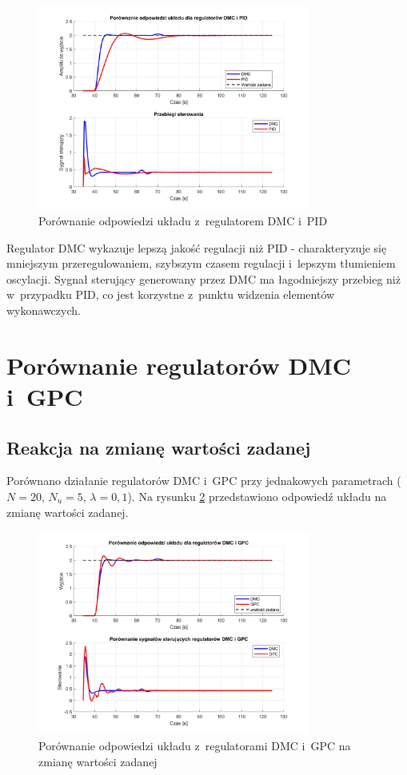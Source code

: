 \documentclass[a4paper,titlepage,11pt,floatssmall]{mwrep}
\begin{document}
\begin{figure}[H]
    \centering
    \includegraphics[width=0.8\textwidth]{kod/wykresy/optimal_solution.jpg}
    \caption{Porównanie odpowiedzi układu z~regulatorem DMC i~PID}
    \label{fig:dmc_pid}
\end{figure}

Regulator DMC wykazuje lepszą jakość regulacji niż PID - charakteryzuje się mniejszym przeregulowaniem, szybszym czasem regulacji i~lepszym tłumieniem oscylacji. Sygnał sterujący generowany przez DMC ma łagodniejszy przebieg niż w~przypadku PID, co jest korzystne z~punktu widzenia elementów wykonawczych.

\section{Porównanie regulatorów DMC i~GPC}

\subsection{Reakcja na zmianę wartości zadanej}

Porównano działanie regulatorów DMC i~GPC przy jednakowych parametrach ($N = 20$, $N_u = 5$, $\lambda = 0,1$). Na rysunku \ref{fig:dmc_gpc_setpoint} przedstawiono odpowiedź układu na zmianę wartości zadanej.

\begin{figure}[H]
    \centering
    \includegraphics[width=0.8\textwidth]{kod/wykresy/DMC_vs_GPC_setpoint.jpg}
    \caption{Porównanie odpowiedzi układu z~regulatorami DMC i~GPC na zmianę wartości zadanej}
    \label{fig:dmc_gpc_setpoint}
\end{figure}
\end{document}
